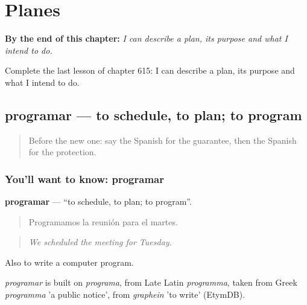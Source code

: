 
\chapter{Planes}
\label{ch:es-planes}

\begin{chapteropening}
\textbf{By the end of this chapter:} \emph{I can describe a plan, its purpose and what I intend to do.}

Complete the last lesson of chapter 615: I can describe a plan, its purpose and what I intend to do.
\end{chapteropening}

\section[programar]{programar — to schedule, to plan; to program}

\label{lesson:ES-C615-programar}



\begin{quote}
Before the new one: say the Spanish for the guarantee, then the Spanish for the protection.
\end{quote}

\subsection*{You'll want to know: programar}
\textbf{programar} — \textquotedblleft{}to schedule, to plan; to program\textquotedblright{}.

\begin{quote}
Programamos la reunión para el martes.
\end{quote}

\begin{quote}
\emph{We scheduled the meeting for Tuesday.}
\end{quote}

Also to write a computer program.

\begin{cousinweb}
\emph{programar} is built on \emph{programa}, from Late Latin \emph{programma}, taken from Greek \emph{programma} 'a public notice', from \emph{graphein} 'to write' (EtymDB).
\end{cousinweb}

